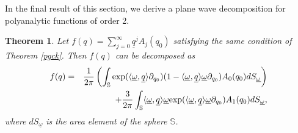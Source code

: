 \documentclass[reqno,11pt]{amsart}
\numberwithin{equation}{section}
\newtheorem{theorem}{Theorem}[section]
\theoremstyle{definition}
\begin{document}
In the final result of this section, we derive a plane wave decomposition for polyanalytic functions of order 2.


\begin{theorem}
\label{pgckwave}
Let $f(q)= \sum_{j=0}^\infty \underline{q}^j A_j(q_0)$ satisfying the same condition of Theorem \ref{pgck}. Then $f(q)$ can be decomposed as
\begin{eqnarray*}
f(q)&=& \frac{1}{2 \pi} \left( \int_{\mathbb{S}} \hbox{exp}(\langle \underline{\omega}, \underline{q} \rangle \partial_{q_0})(1- \langle \underline{\omega}, \underline{q} \rangle \underline{\omega} \partial_{q_0}) A_0(q_0)dS_{\underline{\omega}}\right)\\
&&+ \frac{3}{2 \pi} \int_{\mathbb{S}} \langle \underline{\omega}, \underline{q} \rangle \underline{\omega} \hbox{exp}(\langle \underline{\omega}, \underline{q} \rangle \underline{\omega} \partial_{q_0})A_1(q_0)dS_{\underline{\omega}},
\end{eqnarray*}
where $dS_{\underline{\omega}}$ is the area element of the sphere $\mathbb{S}$.
\end{theorem}
\end{document}
